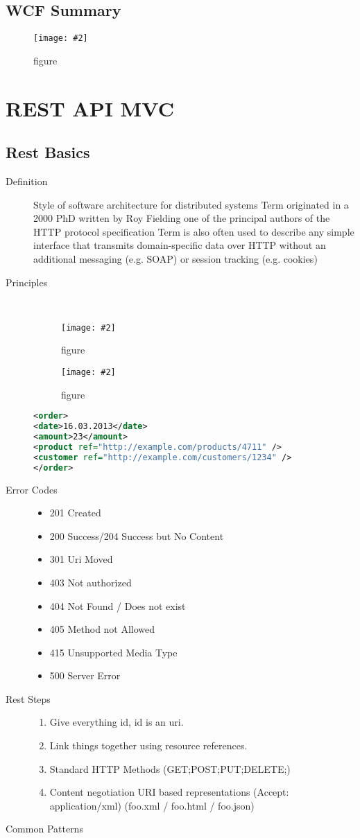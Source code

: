 \documentclass[a4paper,10pt]{scrreprt}
\newcommand{\pic}[2][figure]{\begin{figure}[h]
 \centering
 \texttt{[image: \#2]}
 \caption{#1}
\end{figure}
}
\begin{document}
\section{WCF Summary}
\pic{ws.png}

\chapter{REST API MVC}
\section{Rest Basics}
\begin{description}
 \item [Definition] Style of software architecture for distributed systems
Term originated in a 2000 PhD written by Roy Fielding
one of the principal authors of the HTTP protocol specification
Term is also often used to describe any simple interface that
transmits domain-specific data over HTTP without an additional
messaging (e.g. SOAP) or session tracking (e.g. cookies)
\item [Principles] \hfill \\
\pic{restprin.png}
\pic{repor.png}
\begin{lstlisting}[caption=Verlingung mit Rest,language=xml]
 <order>
<date>16.03.2013</date>
<amount>23</amount>
<product ref="http://example.com/products/4711" />
<customer ref="http://example.com/customers/1234" />
</order>
\end{lstlisting}
\item[Error Codes]\begin{itemize}                   
 \item 201 Created
\item 200 Success/204 Success but No Content
\item 301 Uri Moved
\item 403 Not authorized
\item 404 Not Found / Does not exist
\item 405 Method not Allowed
\item 415 Unsupported Media Type
\item 500 Server Error
\end{itemize}
\item[Rest Steps] \begin{enumerate}
                   \item Give everything id, id is an uri.
                   \item Link things together using resource references.
                   \item Standard HTTP Methods (GET;POST;PUT;DELETE;)
                   \item Content negotiation URI based representations (Accept: application/xml) (foo.xml / foo.html / 
foo.json)
                   \end{enumerate}
\item[Common Patterns]
\begin{itemize}


\end{itemize}
\end{description}
\end{document}
